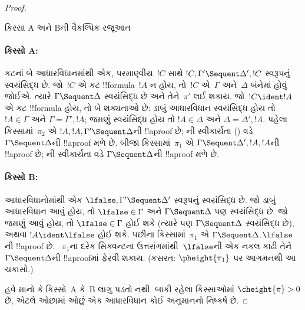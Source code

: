\documentclass[../../../include/open-logic-section]{subfiles}
\begin{document}
\begin{proof}
\begin{center}
કિસ્સા A અને Bની વૈકલ્પિક રજૂઆત
\end{center}

\paragraph{કિસ્સો A:}
કટનાં બે આધારવિધાનમાંથી એક,
પરમાણ્વીય~$!C$ સાથે
$!C, \Gamma' \Sequent \Delta', !C$
સ્વરૂપનું સ્વયંસિદ્ધ છે.
જો~$!C$ એ કટ !!{formula}~$!A$ ન હોય,
તો~$!C$ એ~$\Gamma$ અને~$\Delta$ બંનેમાં
હોવું જોઈએ. ત્યારે
$\Gamma \Sequent \Delta$ સ્વયંસિદ્ધ છે
અને તેને~$\pi'$ લઈ શકાય.
જો~$!C \ident !A$ એ કટ !!{formula} હોય,
તો બે શક્યતાઓ છે: ડાબું આધારવિધાન સ્વયંસિદ્ધ
હોય તો $!A \in \Gamma$ અને
$\Gamma = \Gamma', !A$;
જમણું સ્વયંસિદ્ધ હોય તો
$!A \in \Delta$ અને
$\Delta = \Delta', !A$.
પહેલા કિસ્સામાં~$\pi_2$ એ
$!A, !A, \Gamma' \Sequent \Delta$ની
!!a{proof} છે; \LeftR{\Contraction}ની
સ્વીકાર્યતા
() વડે
$\Gamma \Sequent \Delta$ની !!a{proof} મળે છે.
બીજા કિસ્સામાં~$\pi_1$ એ
$\Gamma \Sequent \Delta', !A, !A$ની
!!a{proof} છે; \RightR{\Contraction}ની
સ્વીકાર્યતા વડે
$\Gamma \Sequent \Delta$ની !!a{proof} મળે છે.

\paragraph{કિસ્સો B:}
આધારવિધાનોમાંથી એક
$\lfalse, \Gamma' \Sequent \Delta'$
સ્વરૂપનું સ્વયંસિદ્ધ છે.
જો ડાબું આધારવિધાન આવું હોય,
તો $\lfalse \in \Gamma$ અને
$\Gamma \Sequent \Delta$ પણ સ્વયંસિદ્ધ છે.
જો જમણું આવું હોય, તો
$\lfalse \in \Gamma$ હોઈ શકે
(ત્યારે પણ $\Gamma \Sequent \Delta$
સ્વયંસિદ્ધ છે), અથવા
$!A \ident \lfalse$ હોઈ શકે.
પછીના કિસ્સામાં~$\pi_1$ એ
$\Gamma \Sequent \Delta, \lfalse$ની
!!a{proof} છે. ~$\pi_1$ના દરેક
સિક્વન્ટના ઉત્તરાંગમાંથી~$\lfalse$ની
એક નકલ કાઢી તેને
~$\Gamma \Sequent \Delta$ની
!!a{proof}માં ફેરવી શકાય.
(કસરત: $\pheight{\pi_1}$ પર
આગમનથી આ ચકાસો.)

હવે માનો કે કિસ્સો~A કે~B લાગુ પડતો નથી.
બાકી રહેલા કિસ્સાઓમાં
$\cheight{\pi} > 0$ છે, એટલે
ઓછામાં ઓછું એક આધારવિધાન
કોઈ અનુમાનનો નિષ્કર્ષ છે.


\end{proof}
\end{document}
